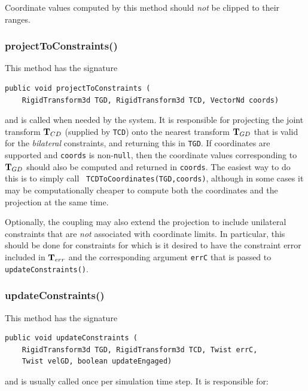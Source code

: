 \begin{sideblock}
Coordinate values computed by this method should {\it not} be clipped
to their ranges.
\end{sideblock}

\subsubsection*{projectToConstraints()}

This method has the signature
\begin{lstlisting}[]
  public void projectToConstraints (
    RigidTransform3d TGD, RigidTransform3d TCD, VectorNd coords)
\end{lstlisting}
%
and is called when needed by the system. It is responsible for
projecting the joint transform ${\bf T}_{CD}$ (supplied by {\tt TCD}) onto
the nearest transform ${\bf T}_{GD}$ that is valid for the {\it bilateral}
constraints, and returning this in {\tt TGD}.  If coordinates are
supported and {\tt coords} is non-{\tt null}, then the coordinate
values corresponding to ${\bf T}_{GD}$ should also be computed and returned
in {\tt coords}. The easiest way to do this is to simply call {\tt
TCDToCoordinates(TGD,coords)}, although in some cases it may be
computationally cheaper to compute both the coordinates and the
projection at the same time.

Optionally, the coupling may also extend the projection to include
unilateral constraints that are {\it not} associated with coordinate
limits. In particular, this should be done for constraints for which
is it desired to have the constraint error included in ${\bf T}_{err}$ and
the corresponding argument {\tt errC} that is passed to {\tt
updateConstraints()}.

\subsubsection*{updateConstraints()}

This method has the signature
%
\begin{lstlisting}[]
  public void updateConstraints (
    RigidTransform3d TGD, RigidTransform3d TCD, Twist errC,
    Twist velGD, boolean updateEngaged)
\end{lstlisting}
%
and is usually called once per simulation time step. It is responsible
for:

